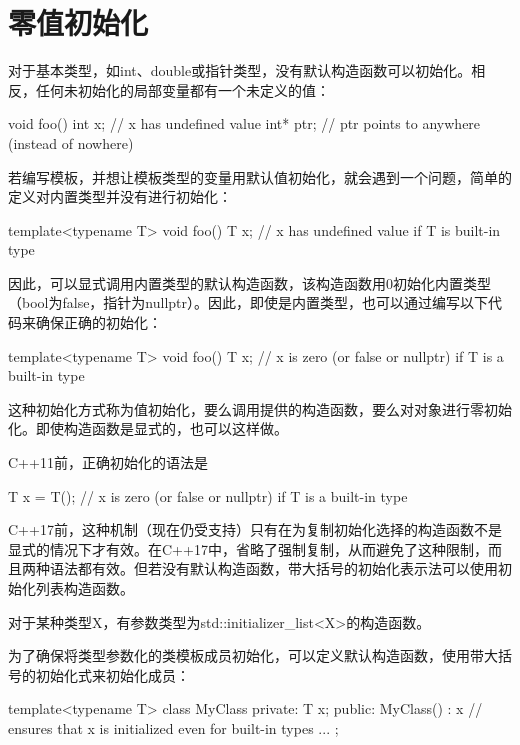 \section{零值初始化}
对于基本类型，如int、double或指针类型，没有默认构造函数可以初始化。相反，任何未初始化的局部变量都有一个未定义的值：

\begin{cpp}
void foo() {
	int x; // x has undefined value
	int* ptr; // ptr points to anywhere (instead of nowhere)
}
\end{cpp}

若编写模板，并想让模板类型的变量用默认值初始化，就会遇到一个问题，简单的定义对内置类型并没有进行初始化：

\begin{cpp}
template<typename T>
void foo() {
	T x; // x has undefined value if T is built-in type
}
\end{cpp}

因此，可以显式调用内置类型的默认构造函数，该构造函数用0初始化内置类型（bool为false，指针为nullptr）。因此，即使是内置类型，也可以通过编写以下代码来确保正确的初始化：

\begin{cpp}
template<typename T>
void foo() {
	T x{}; // x is zero (or false or nullptr) if T is a built-in type
}
\end{cpp}

这种初始化方式称为值初始化，要么调用提供的构造函数，要么对对象进行零初始化。即使构造函数是显式的，也可以这样做。

C++11前，正确初始化的语法是

\begin{cpp}
T x = T(); // x is zero (or false or nullptr) if T is a built-in type
\end{cpp}

C++17前，这种机制（现在仍受支持）只有在为复制初始化选择的构造函数不是显式的情况下才有效。在C++17中，省略了强制复制，从而避免了这种限制，而且两种语法都有效。但若没有默认构造函数，带大括号的初始化表示法可以使用初始化列表构造函数。

\begin{notice}
对于某种类型X，有参数类型为std::initializer\_list<X>的构造函数。
\end{notice}

为了确保将类型参数化的类模板成员初始化，可以定义默认构造函数，使用带大括号的初始化式来初始化成员：

\begin{cpp}
template<typename T>
class MyClass {
private:
	T x;
public:
	MyClass() : x{} { // ensures that x is initialized even for built-in types
	}
	...
};
\end{cpp}


